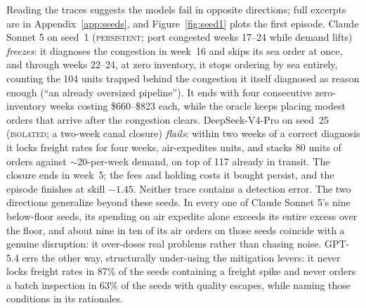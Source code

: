 \documentclass{article}
\begin{document}
Reading the traces suggests the models fail in opposite directions; full
excerpts are in Appendix~\ref{app:seeds}, and Figure~\ref{fig:seed1}
plots the first episode. Claude Sonnet 5 on seed~1 (\textsc{persistent};
port congested weeks 17--24 while demand lifts) \emph{freezes}: it
diagnoses the congestion in week~16 and skips its sea order at once, and
through weeks 22--24, at zero inventory, it stops ordering by sea
entirely, counting the 104 units trapped behind the congestion it itself
diagnosed as reason enough (``an already oversized pipeline''). It ends
with four consecutive zero-inventory weeks costing \$660--\$823 each, while
the oracle keeps placing modest orders that arrive after the congestion
clears. DeepSeek-V4-Pro on seed~25 (\textsc{isolated}; a two-week canal
closure) \emph{flails}: within two weeks of a correct diagnosis it locks
freight rates for four weeks, air-expedites units, and stacks 80 units of
orders against $\sim$20-per-week demand, on top of 117 already in
transit. The closure ends in week~5; the fees and holding costs it bought
persist, and the episode finishes at skill $-1.45$. Neither trace contains
a detection error. The two directions generalize beyond these seeds. In
every one of Claude Sonnet 5's nine below-floor seeds, its spending on
air expedite alone exceeds its entire excess over the floor, and about
nine in ten of its air orders on those seeds coincide with a genuine
disruption: it over-doses real problems rather than chasing noise.
GPT-5.4 errs the other way, structurally under-using the mitigation
levers: it never locks freight rates in 87\% of the seeds containing a
freight spike and never orders a batch inspection in 63\% of the seeds
with quality escapes, while naming those conditions in its rationales.
\end{document}
